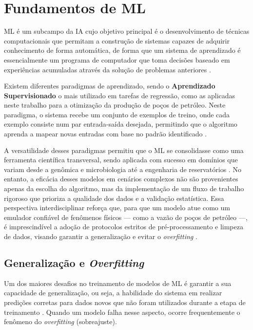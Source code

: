\section{Fundamentos de \gls{ML}}
\label{sec:ml_fundamentos}

\gls{ML} é um subcampo da \gls{IA} cujo objetivo principal é o desenvolvimento de técnicas computacionais que permitam a construção de sistemas capazes de adquirir conhecimento de forma automática, de forma que um sistema de aprendizado é essencialmente um programa de computador que toma decisões baseado em experiências acumuladas através da solução de problemas anteriores \cite{monard2003conceitos}.

Existem diferentes paradigmas de aprendizado, sendo o \textbf{Aprendizado Supervisionado} o mais utilizado em tarefas de regressão, como as aplicadas neste trabalho para a otimização da produção de poços de petróleo. Neste paradigma, o sistema recebe um conjunto de exemplos de treino, onde cada exemplo consiste num par entrada-saída desejada, permitindo que o algoritmo aprenda a mapear novas entradas com base no padrão identificado \cite{monard2003conceitos}.

A versatilidade desses paradigmas permitiu que o \gls{ML} se consolidasse como uma ferramenta científica transversal, sendo aplicada com sucesso em domínios que variam desde a genômica e microbiologia até a engenharia de reservatórios \cite{Asnicar_2024_MachineLearning}. No entanto, a eficácia desses modelos em cenários complexos não são provenientes apenas da escolha do algoritmo, mas da implementação de um fluxo de trabalho rigoroso que prioriza a qualidade dos dados e a validação estatística. Essa perspectiva interdisciplinar reforça que, para que um modelo atue como um emulador confiável de fenômenos físicos — como a vazão de poços de petróleo —, é imprescindível a adoção de protocolos estritos de pré-processamento e limpeza de dados, visando garantir a generalização e evitar o \textit{overfitting} \cite{Asnicar_2024_MachineLearning}.

\subsection{Generalização e \textit{Overfitting}}

Um dos maiores desafios no treinamento de modelos de \gls{ML} é garantir a sua capacidade de generalização, ou seja, a habilidade do sistema em realizar predições corretas para dados novos que não foram utilizados durante a etapa de treinamento \cite{monard2003conceitos}. Quando um modelo falha nesse aspecto, ocorre frequentemente o fenômeno do \textit{overfitting} (sobreajuste).

